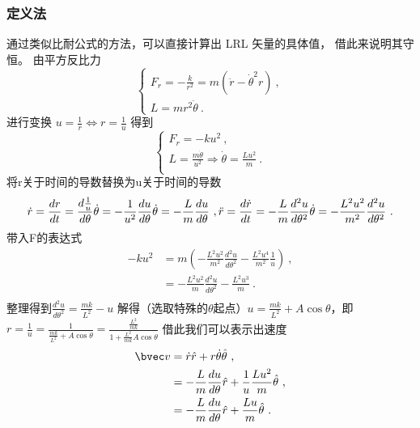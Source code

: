 \subsubsection{定义法}
通过类似比耐公式的方法，可以直接计算出 LRL 矢量的具体值， 借此来说明其守恒。 由平方反比力
\begin{equation}
\begin{cases}
F_{r}=-\frac{k}{r^{2}} = m\left(\ddot r -\dot \theta ^{2}r\right)~, \\
L = mr^{2}\dot \theta ~.
\end{cases}
\end{equation}
进行变换 $u = \frac{1}{r} \Longleftrightarrow r = \frac{1}{u}$ 得到
\begin{equation}
\begin{cases}
F_{r}= -ku^{2} ~,\\
L = \frac{m\dot \theta}{u^{2}}\Rightarrow \dot \theta = \frac{Lu^2}{m} ~.\\
\end{cases}
\end{equation}
将r关于时间的导数替换为u关于时间的导数
\begin{equation}
\dot r = \frac{dr}{dt}= \frac{d \frac{1}{u}}{d\theta}\dot \theta =-\frac{1}{u^{2} } \frac{du}{d\theta} \dot \theta = -\frac{L}{m}\frac{du}{d\theta}~,\\
\ddot r = \frac{d \dot r}{d t} =-\frac{L}{m} \frac{d^{2}u}{d \theta^{2}} \dot \theta = -\frac{L^{2}u^{2}}{m^{2}}\frac{d^{2}u}{d \theta^{2}}~.\\
\end{equation}
带入F的表达式
\begin{align}
-ku^{2}
&=m\left(-\frac{L^{2}u^{2}}{m^{2}}\frac{d^{2}u}{d \theta^{2}}-\frac{L^{2}u^{4}}{m^{2}}\frac{1}{u}\right)~,\\
&= -\frac{L^{2}u^{2}}{m}\frac{d^{2}u}{d \theta^{2}}-\frac{L^{2}u^{3}}{m}~.\\
\end{align}
整理得到$\frac{d^{2}u}{d\theta^{2}} = \frac{mk}{L^{2}}-u$
解得（选取特殊的$\theta$起点）$u = \frac{mk}{L^{2}} + A \cos \theta$，即$r = \frac{1}{u} = \frac{1}{\frac{mk}{L^{2}} + A \cos \theta} = \frac{\frac{L^2}{mk}}{1 + \frac{L^2}{mk} A \cos \theta}$
借此我们可以表示出速度
\begin{align}
\bvec v &= \dot r \hat r + r \dot \theta \hat \theta ~,\\
&=-\frac{L}{m}\frac{du}{d\theta} \hat r + \frac{1}{u} \frac{Lu^{2}}{m} \hat \theta ~,\\
&=-\frac{L}{m}\frac{du}{d\theta} \hat r +  \frac{Lu}{m} \hat \theta ~.\\
\end{align}
